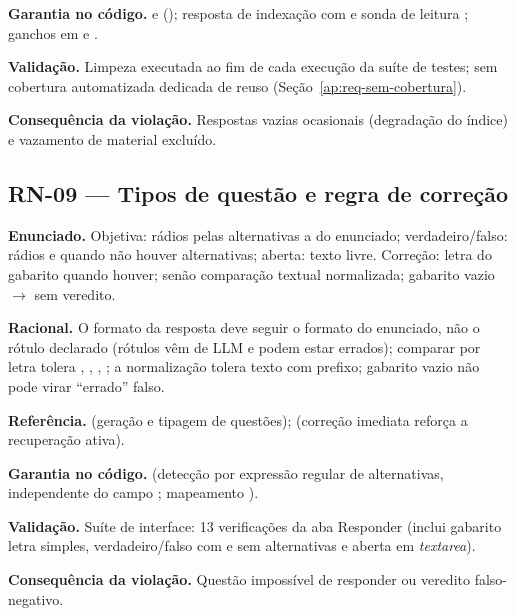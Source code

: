 \textbf{Garantia no código.} \texttt{} e \texttt{} (); resposta de indexação com \texttt{} e sonda de leitura \texttt{}; ganchos em \texttt{} e \texttt{}.

\textbf{Validação.} Limpeza executada ao fim de cada execução da suíte de testes; sem cobertura automatizada dedicada de reuso (Seção~\ref{ap:req-sem-cobertura}).

\textbf{Consequência da violação.} Respostas vazias ocasionais (degradação do índice) e vazamento de material excluído.

\subsection{RN-09 --- Tipos de questão e regra de correção}

\textbf{Enunciado.} Objetiva: rádios pelas alternativas \texttt{} a \texttt{} do enunciado; verdadeiro/falso: rádios \texttt{} e \texttt{} quando não houver alternativas; aberta: texto livre. Correção: letra do gabarito quando houver; senão comparação textual normalizada; gabarito vazio $\rightarrow$ sem veredito.

\textbf{Racional.} O formato da resposta deve seguir o formato do enunciado, não o rótulo declarado (rótulos vêm de LLM e podem estar errados); comparar por letra tolera \texttt{}, \texttt{}, \texttt{}, \texttt{}; a normalização tolera texto com prefixo; gabarito vazio não pode virar ``errado'' falso.

\textbf{Referência.} \cite{alshahrani_2025_qg} (geração e tipagem de questões); \cite{roediger_karpicke_2006} (correção imediata reforça a recuperação ativa).

\textbf{Garantia no código.}  (detecção por expressão regular de alternativas, independente do campo \texttt{}; mapeamento \texttt{}).

\textbf{Validação.} Suíte de interface: 13 verificações da aba Responder (inclui gabarito letra simples, verdadeiro/falso com e sem alternativas e aberta em \textit{textarea}).

\textbf{Consequência da violação.} Questão impossível de responder ou veredito falso-negativo.

